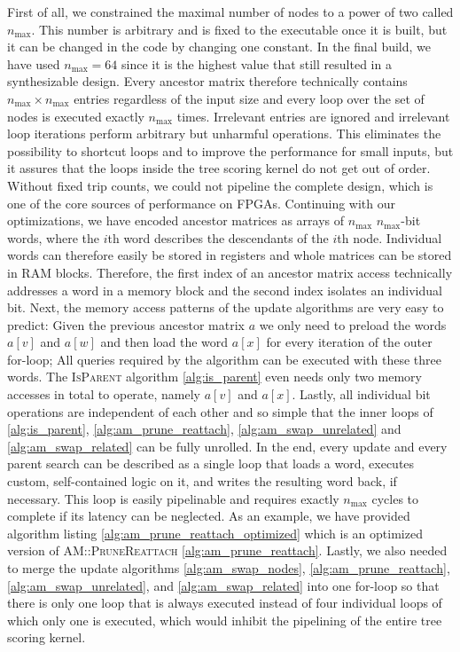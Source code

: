 First of all, we constrained the maximal number of nodes to a power of two called $n_\mathrm{max}$. This number is arbitrary and is fixed to the executable once it is built, but it can be changed in the code by changing one constant. In the final build, we have used $n_\mathrm{max} = 64$ since it is the highest value that still resulted in a synthesizable design. Every ancestor matrix therefore technically contains $n_\mathrm{max} \times n_\mathrm{max}$ entries regardless of the input size and every loop over the set of nodes is executed exactly $n_\mathrm{max}$ times. Irrelevant entries are ignored and irrelevant loop iterations perform arbitrary but unharmful operations. This eliminates the possibility to shortcut loops and to improve the performance for small inputs, but it assures that the loops inside the tree scoring kernel do not get out of order. Without fixed trip counts, we could not pipeline the complete design, which is one of the core sources of performance on \acp{FPGA}. Continuing with our optimizations, we have encoded ancestor matrices as arrays of $n_\mathrm{max}$ $n_\mathrm{max}$-bit words, where the $i$th word describes the descendants of the $i$th node. Individual words can therefore easily be stored in registers and whole matrices can be stored in \ac{RAM} blocks. Therefore, the first index of an ancestor matrix access technically addresses a word in a memory block and the second index isolates an individual bit. Next, the memory access patterns of the update algorithms are very easy to predict: Given the previous ancestor matrix $a$ we only need to preload the words $a[v]$ and $a[w]$ and then load the word $a[x]$ for every iteration of the outer for-loop; All queries required by the algorithm can be executed with these three words. The \textsc{IsParent} algorithm \ref{alg:is_parent} even needs only two memory accesses in total to operate, namely $a[v]$ and $a[x]$. Lastly, all individual bit operations are independent of each other and so simple that the inner loops of \ref{alg:is_parent}, \ref{alg:am_prune_reattach}, \ref{alg:am_swap_unrelated} and \ref{alg:am_swap_related} can be fully unrolled. In the end, every update and every parent search can be described as a single loop that loads a word, executes custom, self-contained logic on it, and writes the resulting word back, if necessary. This loop is easily pipelinable and requires exactly $n_\mathrm{max}$ cycles to complete if its latency can be neglected. As an example, we have provided algorithm listing \ref{alg:am_prune_reattach_optimized} which is an optimized version of \textsc{AM::PruneReattach} \ref{alg:am_prune_reattach}. Lastly, we also needed to merge the update algorithms \ref{alg:am_swap_nodes}, \ref{alg:am_prune_reattach}, \ref{alg:am_swap_unrelated}, and \ref{alg:am_swap_related} into one for-loop so that there is only one loop that is always executed instead of four individual loops of which only one is executed, which would inhibit the pipelining of the entire tree scoring kernel.

